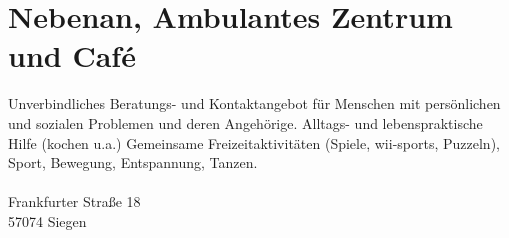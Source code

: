 \section{Nebenan, Ambulantes Zentrum und Café }
Unverbindliches Beratungs- und Kontaktangebot für Menschen mit persönlichen und sozialen Problemen und deren Angehörige. Alltags- und lebenspraktische Hilfe (kochen u.a.) Gemeinsame Freizeitaktivitäten (Spiele, wii-sports, Puzzeln), Sport, Bewegung, Entspannung, Tanzen.\\
\\
Frankfurter Straße 18\\
57074 Siegen